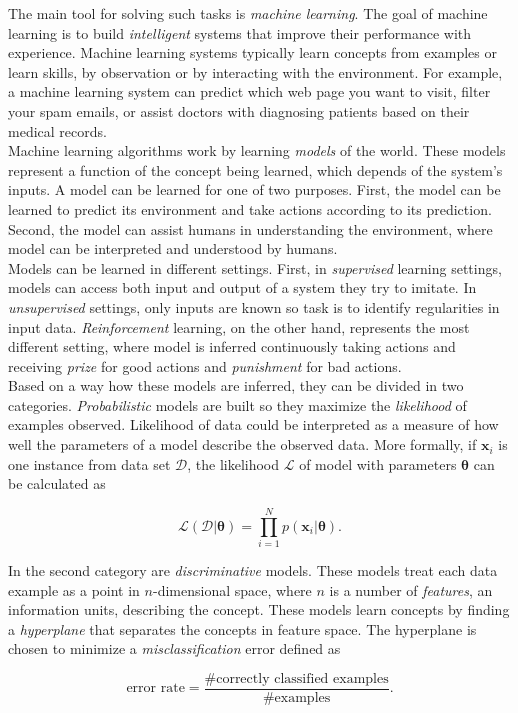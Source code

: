 The main tool for solving such tasks is \textit{machine learning}. The goal of machine learning is to build \textit{intelligent} systems that improve their performance  with experience. Machine learning systems typically learn concepts from examples or learn skills,  by observation or by interacting with the environment. For example, a machine learning system can predict which web page you want to visit, filter your spam emails, or assist doctors with diagnosing patients based on their medical records. \\


Machine learning algorithms work by learning \textit{models} of the world. These models represent a function of  the concept being learned, which depends of the system's inputs. A model can be learned for one of two purposes.  First, the model can be learned to predict its environment and take actions according to its prediction. Second, the model can assist humans in understanding the environment, where model can be interpreted and understood by humans. \\

Models can be learned in different settings. First, in \textit{supervised} learning settings, models can access both input and output of a system they try to imitate. In \textit{unsupervised} settings, only inputs are known so task is to identify regularities in input data. \textit{Reinforcement} learning, on the other hand, represents the most different setting, where model is inferred continuously taking actions  and receiving \textit{prize} for good actions and \textit{punishment} for bad actions. \\

Based on a way how these models are inferred, they can be divided in two categories. \textit{Probabilistic} models are built so they maximize the \textit{likelihood} of examples observed. Likelihood of data could be interpreted as a measure of how well the parameters of a model describe the observed data. More formally, if $\mathbf{x}_i$ is one instance from data set $\mathcal{D}$, the likelihood $\mathcal{L}$ of model with parameters $\boldsymbol \theta$ can be calculated as 

\begin{equation}
	\mathcal{L}(\mathcal{D} | \boldsymbol \theta) = \prod_{i=1}^{N}p(\mathbf{x}_i | \boldsymbol \theta). 
\end{equation}

In the second category are \textit{discriminative} models. These models treat each data example as a point in $n$-dimensional space, where $n$ is a number of \textit{features}, an information units, describing the concept. These models learn concepts by finding a \textit{hyperplane} that separates the concepts in feature space. The hyperplane is chosen to minimize a \textit{misclassification} error defined as

\begin{equation}
	\text{error rate} = \frac{\text{\#correctly classified examples}}{\text{\#examples} }.
\end{equation}